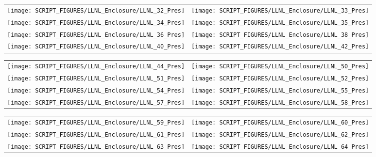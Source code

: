 \begin{figure}[p]
\begin{tabular*}{\textwidth}{l@{\extracolsep{\fill}}r}
\texttt{[image: SCRIPT\_FIGURES/LLNL\_Enclosure/LLNL\_32\_Pres]} &
\texttt{[image: SCRIPT\_FIGURES/LLNL\_Enclosure/LLNL\_33\_Pres]} \\
\texttt{[image: SCRIPT\_FIGURES/LLNL\_Enclosure/LLNL\_34\_Pres]} &
\texttt{[image: SCRIPT\_FIGURES/LLNL\_Enclosure/LLNL\_35\_Pres]} \\
\texttt{[image: SCRIPT\_FIGURES/LLNL\_Enclosure/LLNL\_36\_Pres]} &
\texttt{[image: SCRIPT\_FIGURES/LLNL\_Enclosure/LLNL\_38\_Pres]} \\
\texttt{[image: SCRIPT\_FIGURES/LLNL\_Enclosure/LLNL\_40\_Pres]} &
\texttt{[image: SCRIPT\_FIGURES/LLNL\_Enclosure/LLNL\_42\_Pres]}
\end{tabular*}
\label{LLNL_Enclosure_Pres_4}
\end{figure}

\begin{figure}[p]
\begin{tabular*}{\textwidth}{l@{\extracolsep{\fill}}r}
\texttt{[image: SCRIPT\_FIGURES/LLNL\_Enclosure/LLNL\_44\_Pres]} &
\texttt{[image: SCRIPT\_FIGURES/LLNL\_Enclosure/LLNL\_50\_Pres]} \\
\texttt{[image: SCRIPT\_FIGURES/LLNL\_Enclosure/LLNL\_51\_Pres]} &
\texttt{[image: SCRIPT\_FIGURES/LLNL\_Enclosure/LLNL\_52\_Pres]} \\
\texttt{[image: SCRIPT\_FIGURES/LLNL\_Enclosure/LLNL\_54\_Pres]} &
\texttt{[image: SCRIPT\_FIGURES/LLNL\_Enclosure/LLNL\_55\_Pres]} \\
\texttt{[image: SCRIPT\_FIGURES/LLNL\_Enclosure/LLNL\_57\_Pres]} &
\texttt{[image: SCRIPT\_FIGURES/LLNL\_Enclosure/LLNL\_58\_Pres]}
\end{tabular*}
\label{LLNL_Enclosure_Pres_5}
\end{figure}

\begin{figure}[p]
\begin{tabular*}{\textwidth}{l@{\extracolsep{\fill}}r}
\texttt{[image: SCRIPT\_FIGURES/LLNL\_Enclosure/LLNL\_59\_Pres]} &
\texttt{[image: SCRIPT\_FIGURES/LLNL\_Enclosure/LLNL\_60\_Pres]} \\
\texttt{[image: SCRIPT\_FIGURES/LLNL\_Enclosure/LLNL\_61\_Pres]} &
\texttt{[image: SCRIPT\_FIGURES/LLNL\_Enclosure/LLNL\_62\_Pres]} \\
\texttt{[image: SCRIPT\_FIGURES/LLNL\_Enclosure/LLNL\_63\_Pres]} &
\texttt{[image: SCRIPT\_FIGURES/LLNL\_Enclosure/LLNL\_64\_Pres]}
\end{tabular*}
\label{LLNL_Enclosure_Pres_6}
\end{figure}

